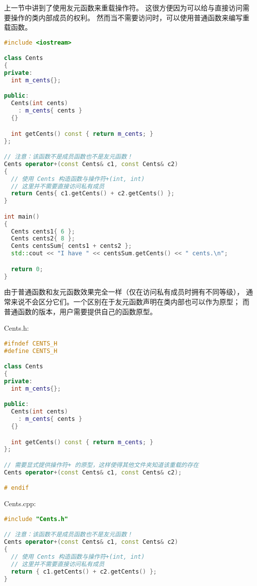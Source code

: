 \documentclass[../../LearnCpp.tex]{subfiles}
\begin{document}

上一节中讲到了使用友元函数来重载操作符。
这很方便因为可以给与直接访问需要操作的类内部成员的权利。
然而当不需要访问时，可以使用普通函数来编写重载函数。

\begin{lstlisting}[language=C++]
#include <iostream>

class Cents
{
private:
  int m_cents{};

public:
  Cents(int cents)
    : m_cents{ cents }
  {}

  int getCents() const { return m_cents; }
};

// 注意：该函数不是成员函数也不是友元函数！
Cents operator+(const Cents& c1, const Cents& c2)
{
  // 使用 Cents 构造函数与操作符+(int, int)
  // 这里并不需要直接访问私有成员
  return Cents{ c1.getCents() + c2.getCents() };
}

int main()
{
  Cents cents1{ 6 };
  Cents cents2{ 8 };
  Cents centsSum{ cents1 + cents2 };
  std::cout << "I have " << centsSum.getCents() << " cents.\n";

  return 0;
}
\end{lstlisting}

由于普通函数和友元函数效果完全一样（仅在访问私有成员时拥有不同等级），
通常来说不会区分它们。一个区别在于友元函数声明在类内部也可以作为原型；
而普通函数的版本，用户需要提供自己的函数原型。

Cents.h:

\begin{lstlisting}[language=C++]
#ifndef CENTS_H
#define CENTS_H

class Cents
{
private:
  int m_cents{};

public:
  Cents(int cents)
    : m_cents{ cents }
  {}

  int getCents() const { return m_cents; }
};

// 需要显式提供操作符+ 的原型，这样使得其他文件夹知道该重载的存在
Cents operator+(const Cents& c1, const Cents& c2);

# endif
\end{lstlisting}

Cents.cpp:

\begin{lstlisting}[language=C++]
#include "Cents.h"

// 注意：该函数不是成员函数也不是友元函数！
Cents operator+(const Cents& c1, const Cents& c2)
{
  // 使用 Cents 构造函数与操作符+(int, int)
  // 这里并不需要直接访问私有成员
  return { c1.getCents() + c2.getCents() };
}
\end{lstlisting}
\end{document}
